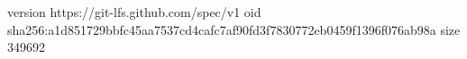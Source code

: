 version https://git-lfs.github.com/spec/v1
oid sha256:a1d851729bbfc45aa7537cd4cafc7af90fd3f7830772eb0459f1396f076ab98a
size 349692
